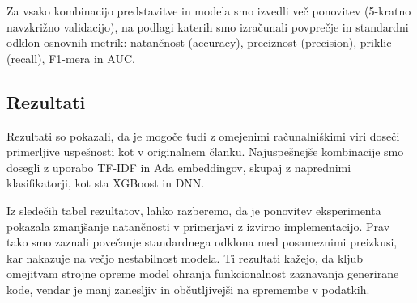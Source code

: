 \documentclass[sigconf,nonacm]{acmart}
\begin{document}
Za vsako kombinacijo predstavitve in modela smo izvedli več ponovitev (5-kratno navzkrižno validacijo), na podlagi katerih smo izračunali povprečje in standardni odklon osnovnih metrik: natančnost (accuracy), preciznost (precision), priklic (recall), F1-mera in \acrfull{AUC}.

\subsection{Rezultati}
Rezultati so pokazali, da je mogoče tudi z omejenimi računalniškimi viri doseči primerljive uspešnosti kot v originalnem članku. Najuspešnejše kombinacije smo dosegli z uporabo \acrshort{TF-IDF} in Ada embeddingov, skupaj z naprednimi klasifikatorji, kot sta XGBoost in \acrshort{DNN}.

Iz sledečih tabel rezultatov, lahko razberemo, da je ponovitev eksperimenta pokazala zmanjšanje natančnosti v primerjavi z izvirno implementacijo. Prav tako smo zaznali povečanje standardnega odklona med posameznimi preizkusi, kar nakazuje na večjo nestabilnost modela. Ti rezultati kažejo, da kljub omejitvam strojne opreme model ohranja funkcionalnost zaznavanja generirane kode, vendar je manj zanesljiv in občutljivejši na spremembe v podatkih.
\end{document}
